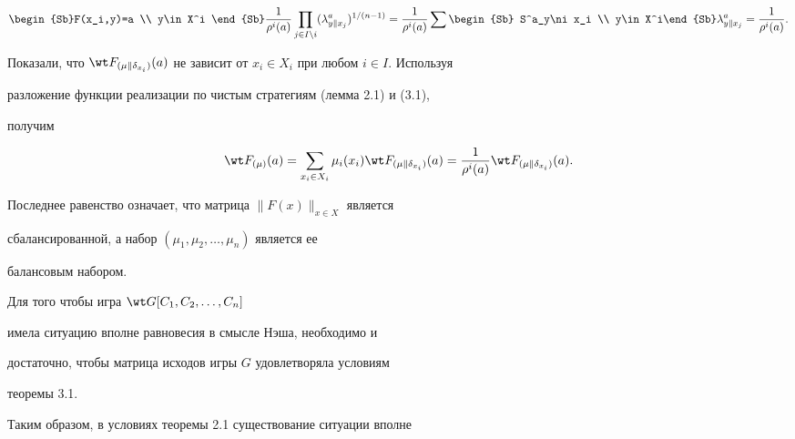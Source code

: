 \begin{pf}
\begin{equation}
\begin{Sb}F(x_i,y)=a \\ y\in X^i \end{Sb}\frac{1}{\rho^i(a)} 


\prod_{j\in I\setminus i}(\lambda^a_{y\|x_j})^{1/(n-1)} 


=\frac{1}{\rho^i(a)}\sum\begin{Sb} 


S^a_y\ni x_i \\ y\in X^i\end{Sb} 


\lambda^a_{y\|x_j}=\frac{1}{\rho^i(a)}. 


\end{equation} 


Показали, что $\wt F_{(\mu\|\delta_{x_i})}(a)$ не зависит от $x_i\in 


X_i$ при любом $i\in I$. Используя 


разложение функции реализации по чистым стратегиям (лемма 2.1) и (3.1), 


получим 


$$ 


\wt F_{(\mu)}(a)=\sum_{x_i\in X_i}\mu_i(x_i) 


\wt F_{(\mu\|\delta_{x_i})}(a)=\frac{1}{\rho^i(a)} 


\wt F_{(\mu\|\delta_{x_i})}(a). 


$$ 


Последнее равенство означает, что матрица $\|F(x)\|_{x\in X}$ является 


сбалансированной, а набор $(\mu_1,\mu_2,\dotsc,\mu_n)$ является ее 


балансовым набором. 


\end{pf}


 


\begin{cornonum} 


Для того чтобы игра $\wt G[C_1,C_2,\dotsc,C_n]$ 


имела ситуацию вполне равновесия в смысле Нэша, необходимо и 


достаточно, чтобы матрица исходов игры $G$ удовлетворяла условиям 


теоремы 3.1. 


\end{cornonum} 


 


Таким образом, в условиях теоремы 2.1 существование ситуации вполне 


